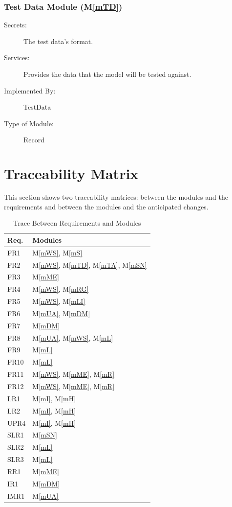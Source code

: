 \documentclass[12pt, titlepage]{article}
\newcommand{\mref}[1]{M\ref{#1}}
\begin{document}
\subsubsection{Test Data Module (\mref{mTD})}

\begin{description}
\item[Secrets:] The test data's format.
\item[Services:] Provides the data that the model will be tested against.
\item[Implemented By:] TestData
\item[Type of Module:] Record
\end{description}

\section{Traceability Matrix} \label{SecTM}

This section shows two traceability matrices: between the modules and the
requirements and between the modules and the anticipated changes.

\begin{table}[H]
\centering
\begin{tabular}{p{} p{}}
\toprule
\textbf{Req.} & \textbf{Modules}\\
\midrule
FR1 & \mref{mWS}, \mref{mS}\\
FR2 & \mref{mWS}, \mref{mTD}, \mref{mTA}, \mref{mSN}\\
FR3 & \mref{mME}\\
FR4 & \mref{mWS}, \mref{mRG}\\
FR5 & \mref{mWS}, \mref{mLI}\\
FR6 & \mref{mUA}, \mref{mDM}\\
FR7 & \mref{mDM}\\
FR8 & \mref{mUA}, \mref{mWS}, \mref{mL}\\
FR9 & \mref{mL}\\
FR10 & \mref{mL}\\
FR11 & \mref{mWS}, \mref{mME}, \mref{mR}\\
FR12 & \mref{mWS}, \mref{mME}, \mref{mR}\\
LR1 & \mref{mI}, \mref{mH} \\
LR2 & \mref{mI}, \mref{mH}\\
UPR4 & \mref{mI}, \mref{mH}\\
SLR1 & \mref{mSN}\\
SLR2 & \mref{mL}\\
SLR3 & \mref{mL}\\
RR1 & \mref{mME}\\
IR1 & \mref{mDM}\\
IMR1 & \mref{mUA}\\
\bottomrule
\end{tabular}
\caption{Trace Between Requirements and Modules}
\label{TblRT}
\end{table}
\end{document}
